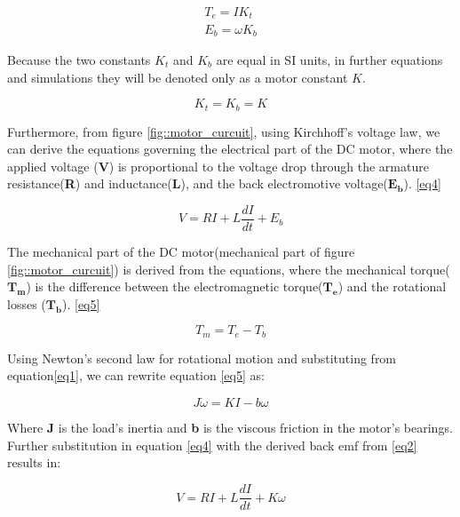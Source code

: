 \begin{align}  
T_e = IK_t \label{eq1}\\
E_b = \omega K_b \label{eq2}
\end{align}

Because the two constants $K_t$ and $K_b$ are equal in SI units, in further equations and simulations they will be denoted only as a motor constant $K$.


\begin{equation} \label{eq3}
K_t = K_b = K
\end{equation} 

Furthermore, from figure \ref{fig::motor_curcuit}, using Kirchhoff's voltage law, we can derive the equations governing the electrical part of the DC motor, where the applied voltage (\textbf{V}) is proportional to the voltage drop through the armature resistance(\textbf{R}) and inductance(\textbf{L}), and the back electromotive voltage($\boldsymbol{E_b}$). \ref{eq4}

\begin{equation} \label{eq4}
V = RI + L\frac{dI}{dt} + E_b
\end{equation} 

The mechanical part of the DC motor(mechanical part of figure \ref{fig::motor_curcuit}) is derived from the equations, where the mechanical torque($\boldsymbol{T_m}$) is the difference between the electromagnetic torque($\boldsymbol{T_e}$) and the rotational losses ($\boldsymbol{T_b}$). \ref{eq5}

\begin{equation} \label{eq5} 
T_m = T_e - T_b
\end{equation} 

Using Newton's second law for rotational motion and substituting from equation\ref{eq1}, we can rewrite equation \ref{eq5} as:

\begin{equation} \label{eq6}
J\dot{\omega} = KI - b\omega
\end{equation}

Where \textbf{J} is the load's inertia and \textbf{b} is the viscous friction in the motor's bearings.
Further substitution in equation \ref{eq4} with the derived back emf from \ref{eq2} results in:

\begin{equation} \label{eq7}
V = RI + L\frac{dI}{dt} + K\omega
\end{equation}

